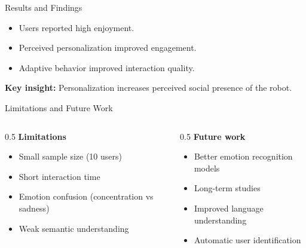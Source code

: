 \documentclass[aspectratio=169,10pt]{beamer}
\begin{document}

\begin{frame}{Results and Findings}
\footnotesize

\begin{itemize}\footnotesize
    \item Users reported high enjoyment.
    \item Perceived personalization improved engagement.
    \item Adaptive behavior improved interaction quality.
\end{itemize}

\vspace{0.5em}

\textbf{Key insight:}
Personalization increases perceived social presence of the robot.

\end{frame}


\begin{frame}{Limitations and Future Work}
\footnotesize

\begin{columns}[T]

\begin{column}{0.5\textwidth}
\textbf{Limitations}
\begin{itemize}\footnotesize
    \item Small sample size (10 users)
    \item Short interaction time
    \item Emotion confusion (concentration vs sadness)
    \item Weak semantic understanding
\end{itemize}
\end{column}

\begin{column}{0.5\textwidth}
\textbf{Future work}
\begin{itemize}\footnotesize
    \item Better emotion recognition models
    \item Long-term studies
    \item Improved language understanding
    \item Automatic user identification
\end{itemize}
\end{column}

\end{columns}

\end{frame}
\end{document}
